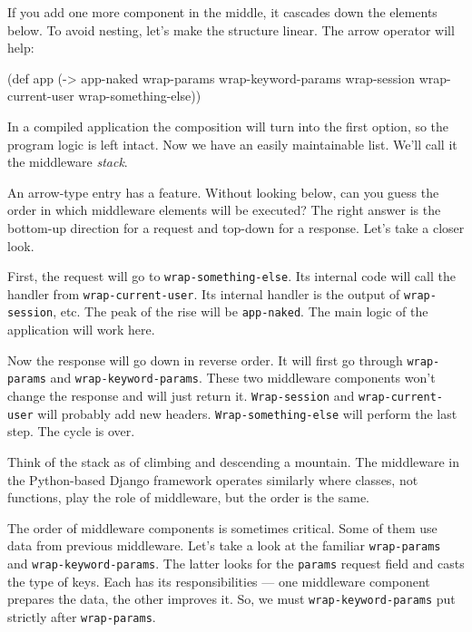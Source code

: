 
If you add one more component in the middle, it cascades down the elements below. To avoid nesting, let's make the structure linear. The arrow operator will help:


\begin{english}
\begin{clojure/lines}
(def app
(-> app-naked
wrap-params
wrap-keyword-params
wrap-session
wrap-current-user
wrap-something-else))
\end{clojure/lines}
\end{english}


In a compiled application the composition will turn into the first option, so the program logic is left intact. Now we have an easily maintainable list. We'll call it
the middleware \emph{stack}.

An arrow-type entry has a feature. Without looking below, can you guess the order in which middleware elements will be executed? The right answer is the bottom-up direction for a request and top-down for a response. Let's take a closer look.


First, the request will go to \verb|wrap-something-else|. Its internal code will call the handler from \verb|wrap-current-user|. Its internal handler is the output of \verb|wrap-session|, etc. The peak of the rise will be \verb|app-naked|. The main logic of the application will work here.

Now the response will go down in reverse order. It will first go through \verb|wrap-params| and \verb|wrap-keyword-params|. These two middleware components won't change the response and will just return it. \verb|Wrap-session| and \verb|wrap-current-user| will probably add new headers. \verb|Wrap-something-else| will perform the last step. The cycle is over.


Think of the stack as of climbing and descending a mountain. The middleware in the Python-based Django framework operates similarly where classes, not functions, play the role of middleware, but the order is the same.

The order of middleware components is sometimes critical. Some of them use data from previous middleware. Let's take a look at the familiar \verb|wrap-params| and
\verb|wrap-keyword-params|. The latter looks for the \verb|params| request field and casts the type of keys. Each has its responsibilities — one middleware component prepares the data, the other improves it. So, we must \verb|wrap-keyword-params| put strictly after \verb|wrap-params|.

